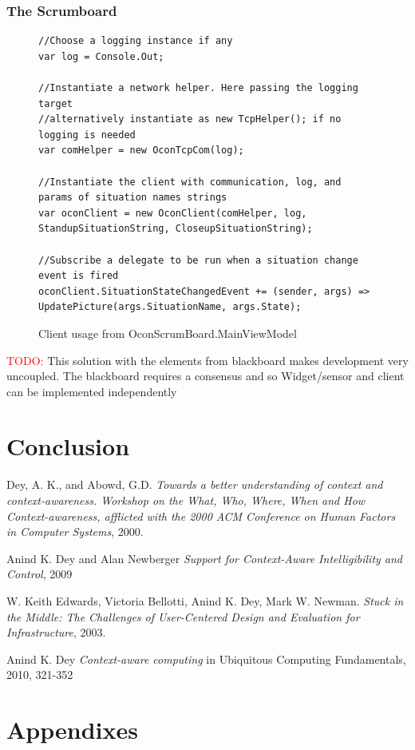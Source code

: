 \documentclass[]{report}
\newcommand\todo[1]{\textcolor{red}{TODO: }#1\PackageWarning{TODO:}{TODO tag!!}}
\begin{document}
\subsection{The Scrumboard}

\begin{figure}[H]
\begin{lstlisting}
//Choose a logging instance if any
var log = Console.Out;

//Instantiate a network helper. Here passing the logging target
//alternatively instantiate as new TcpHelper(); if no logging is needed
var comHelper = new OconTcpCom(log);

//Instantiate the client with communication, log, and params of situation names strings
var oconClient = new OconClient(comHelper, log, StandupSituationString, CloseupSituationString);

//Subscribe a delegate to be run when a situation change event is fired
oconClient.SituationStateChangedEvent += (sender, args) => UpdatePicture(args.SituationName, args.State);
\end{lstlisting}
\caption{Client usage from OconScrumBoard.MainViewModel}
\label{code:OconClient}
\end{figure}


\todo{This solution with the elements from blackboard makes development very uncoupled. The blackboard requires a consensus and so Widget/sensor and client can be implemented independently}

\chapter{Conclusion}

\begin{thebibliography}{9}

  Dey, A. K., and Abowd, G.D.
  \emph{Towards a better understanding of context and context-awareness. Workshop on the What, Who, Where, When and How Context-awareness, afflicted with the 2000 ACM Conference on Human Factors in Computer Systems},
  2000.
  
  	Anind K. Dey and Alan Newberger
  	\emph{Support for Context-Aware Intelligibility and Control}, 2009
  
  
  W. Keith Edwards, Victoria Bellotti, Anind K. Dey,
  Mark W. Newman.
  \emph{Stuck in the Middle: The Challenges of
  User-Centered Design and Evaluation for Infrastructure},
  2003.
  
	Anind K. Dey
	\emph{Context-aware computing} in Ubiquitous Computing Fundamentals, 2010, 321-352

\end{thebibliography}
\chapter{Appendixes}
\end{document}
